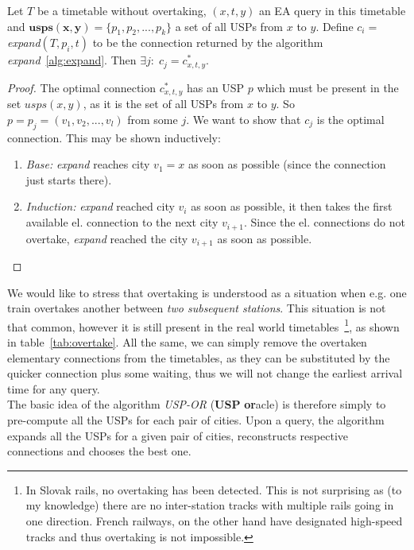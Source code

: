     \begin{lemma}
    	\label{lemma:expandusp}
    	Let $T$ be a timetable without overtaking, $(x, t, y)$ an EA query in this timetable and $\bm{usps(x, y)} = \{p_{1}, p_{2}, ..., p_{k}\}$ a set of all USPs from $x$ to $y$. Define $c_{i} = $\textit{expand}$(T, p_{i}, t)$ to be the connection returned by the algorithm \textit{expand}~\ref{alg:expand}. Then $\exists j:\; c_{j} = c_{x, t, y}^{*}$.
    \end{lemma}
    \begin{proof}
    	The optimal connection $c_{x, t, y}^{*}$ has an USP $p$ which must be present in the set $usps(x, y)$, as it is the set of all USPs from $x$ to $y$. So $p = p_{j} = (v_{1}, v_{2},..., v_{l})$ from some $j$. We want to show that $c_{j}$ is the optimal connection. This may be shown inductively:
    	\begin{enumerate}
    		\item \textit{Base:} \textit{expand} reaches city $v_{1} = x$ as soon as possible (since the connection just starts there).
    		\item \textit{Induction:} \textit{expand} reached city $v_{i}$ as soon as possible, it then takes the first available el. connection to the next city $v_{i + 1}$. Since the el. connections do not overtake, \textit{expand} reached the city $v_{i + 1}$ as soon as possible.
    	\end{enumerate}
    \end{proof}
    
    \noindent We would like to stress that overtaking is understood as a situation when e.g. one train overtakes another between \textit{two subsequent stations}. This situation is not that common, however it is still present in the real world timetables~\footnote{In Slovak rails, no overtaking has been detected. This is not surprising as (to my knowledge) there are no inter-station tracks with multiple rails going in one direction. French railways, on the other hand have designated high-speed tracks and thus overtaking is not impossible.}, as shown in table~\ref{tab:overtake}. All the same, we can simply remove the overtaken elementary connections from the timetables, as they can be substituted by the quicker connection plus some waiting, thus we will not change the earliest arrival time for any query. \\
	
	\noindent The basic idea of the algorithm \textit{USP-OR} (\textbf{USP} \textbf{or}acle) is therefore simply to pre-compute all the USPs for each pair of cities. Upon a query, the algorithm expands all the USPs for a given pair of cities, reconstructs respective connections and chooses the best one. \\
	
